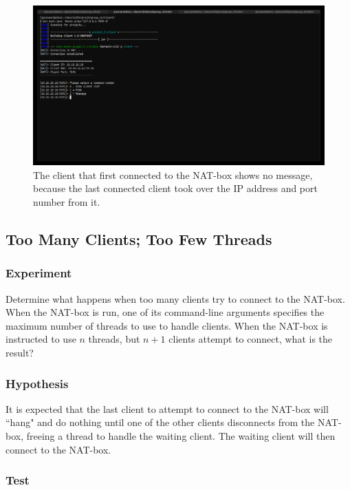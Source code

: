 \documentclass[10pt, a4paper]{article}
\begin{document}
\begin{figure}
  \centering
  \includegraphics[width=12cm]{exp1-3}
  \caption{The client that first connected to the NAT-box shows no message,
  because the last connected client took over the IP address and port number
  from it.}
  \label{fig:exp1-3}
\end{figure}


\subsection{Too Many Clients; Too Few Threads}
\label{ssec:toomany}


\subsubsection{Experiment}
\label{sssec:toomanyexp}

Determine what happens when too many clients try to connect to the NAT-box. When
the NAT-box is run, one of its command-line arguments specifies the maximum
number of threads to use to handle clients. When the NAT-box is instructed to
use $n$ threads, but $n + 1$ clients attempt to connect, what is the result?


\subsubsection{Hypothesis}
\label{sssec:toomanyhyp}

It is expected that the last client to attempt to connect to the NAT-box will
``hang" and do nothing until one of the other clients disconnects from the
NAT-box, freeing a thread to handle the waiting client. The waiting client will
then connect to the NAT-box.


\subsubsection{Test}
\label{sssec:toomanytest}
\end{document}
